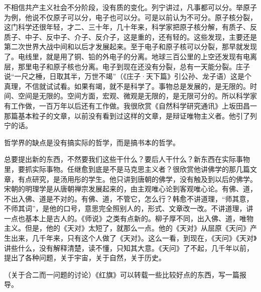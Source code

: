 不相信共产主义社会不分阶段，没有质的变化。列宁讲过，凡事都可以分。举原子为例，他说不仅原子可以分，电子也可以分。可是以前认为不可分。原子核分裂，这门科学还很年轻，才二、三十年，几十年来，科学家把原子核分解，有质子、反质子、中子、反中子、介子、反介子，这是重的，还有轻的。这些发现，主要还是第二次世界大战中间和以后才发展起来。至于电子和原子核可以分裂，那早就发现了。电线里，就是用了铜、铅的外电子的分离。地球三百公里的上空还发现有电离层，那里电子和原子核也分离。电子到现在还没有分裂，总有一天能分裂。庄子说“一尺之棰，日取其半，万世不竭”（《庄子·天下篇》引公孙、龙子语）这是个真理，不信就试试看。如果有竭，就不是科学了。事物总是发展的，是无限的。时间、空间是无限的。空间方面，宏观、微观是无限的，是无限可分的。所以科学家有工作做，一百万年以后还有工作做。我很欣赏《自然科学研究通讯》上坂田昌一那篇基本粒子的文章，以前没有看到过这样的文章，是辩证唯物主义者。他引了列宁的话。

哲学界的缺点是没有搞实际的哲学，而是搞书本的哲学。

总要提出新的东西，不然要我们这些干什么？要后人干什么？新东西在实际事物里，要抓实际事物。任继愈到底是不是马克思主义者？很欣赏他讲佛学的那几篇文章，有点研究，是汤用彤的学生。他只讲到唐朝的佛学，没有触及到以后的佛学。宋朝的明理学是从唐朝禅宗发展起来的，由主观唯心论到客观唯心论。有佛、道，不出入佛、道是不对的。有佛、道，不管它，怎么行？韩愈不讲道理，“师其意，不师其词”，是他的口号，意思完全照别人的，形式、文章改一改。不讲道理，讲一点也基本上是古人的。《师说》之类有点新的。柳子厚不同，出入佛、道，唯物主义。但是，他的《天对》太短了，就那么一点。他的《天对》从屈原《天问》产生出来，几千年来，只有这个人做了《天对》。这么一看，到现在，《天问》《天对》讲些什么，没有解释清楚，读不懂，只知其大意。《天问》了不起，几千年以前，提出了各种问题，关于宇宙，关于自然，关于历史。

（关于合二而一问题的讨论）《红旗》可以转载一些比较好点的东西，写一篇报导。


